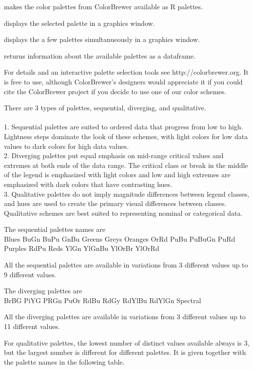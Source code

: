 \begin{Details}\relax
{} makes the color palettes from ColorBrewer
available as R palettes.

 displays the selected palette in a graphics window.

 displays the a few palettes simultanueously in a graphics window.

 returns information about the available palettes as a dataframe.


For details and an interactive palette selection tools see http://colorbrewer.org.
It is free to use, although ColorBrewer's designers would appreciate it if you could cite the ColorBrewer project 
if you decide to use one of our color schemes.


There are 3 types of palettes, sequential, diverging, and qualitative.\\
\\
1. Sequential palettes are suited to ordered data that progress from low to high. 
Lightness steps dominate the look of these schemes, with light colors for low data values 
to dark colors for high data values. 
\\
2. Diverging palettes put equal emphasis on mid-range critical values and extremes at both ends 
of the data range. The critical class or break in the middle of the legend is emphasized 
with light colors and low and high extremes are emphasized with dark colors that have 
contrasting hues. 
\\
3. Qualitative palettes do not imply magnitude differences between legend classes, 
and hues are used to create the primary visual differences between classes. 
Qualitative schemes are best suited to representing nominal or categorical data.

The sequential palettes names are
\\
Blues
BuGn
BuPu
GnBu
Greens
Greys
Oranges
OrRd
PuBu
PuBuGn     
PuRd
Purples
RdPu
Reds
YlGn
YlGnBu
YlOrBr
YlOrRd

All the sequential palettes are available in variations from 3 different values up to 9 different values.

The diverging palettes are \\
BrBG
PiYG
PRGn
PuOr
RdBu
RdGy
RdYlBu
RdYlGn
Spectral

All the diverging palettes are available in variations from 3 different values up to 11 different values.

For qualitative palettes, the lowest number of distinct values available always is 3, but the largest number
is different for different palettes. It is given together with the palette names in the following table.





\end{Details}
